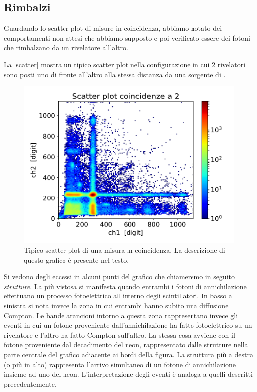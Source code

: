 \subsection{Rimbalzi}

Guardando lo scatter plot di misure in coincidenza, abbiamo notato dei comportamenti non attesi che abbiamo supposto e poi verificato essere dei fotoni che rimbalzano da un rivelatore all'altro.

La \autoref{scatter} mostra un tipico scatter plot
nella configurazione in cui 2 rivelatori sono posti uno di fronte all'altro alla stessa distanza da una sorgente di \na{}.

\begin{figure}[h]
\centering
\includegraphics[width=\textwidth]{immagini/esempio}
\caption{Tipico scatter plot di una misura in coincidenza. La descrizione di questo grafico è presente nel testo.}
\label{scatter}
\end{figure}


Si vedono degli eccessi in alcuni punti del grafico che chiameremo in seguito \emph{strutture}. La più vistosa si manifesta quando entrambi i fotoni di annichilazione effettuano un processo fotoelettrico all'interno degli scintillatori. In basso a sinistra si nota invece la zona in cui entrambi hanno subito una diffusione Compton. Le bande arancioni intorno a questa zona rappresentano invece gli eventi in cui un fotone proveniente dall'annichilazione ha fatto fotoelettrico su un rivelatore e l'altro ha fatto Compton sull'altro.
La stessa cosa avviene con il fotone proveniente dal decadimento del neon, rappresentato dalle strutture nella parte centrale del grafico adiacente ai bordi della figura. La struttura più a destra (o più in alto) rappresenta l'arrivo simultaneo di un fotone di annichilazione insieme ad uno del neon. L'interpretazione degli eventi è analoga a quelli descritti precedentemente.

